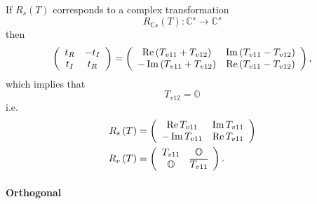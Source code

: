 \documentclass[aps,preprint]{revtex4}%
\begin{document}
If $R_{s}\left(  T\right)  $ corresponds to a complex transformation
\begin{equation}
R_{\mathbb{C}s}\left(  T\right)  :\mathbb{C}^{s}\rightarrow\mathbb{C}^{s}%
\end{equation}
then
\begin{equation}
\left(
\begin{array}
[c]{cc}%
t_{R} & -t_{I}\\
t_{I} & t_{R}%
\end{array}
\right)  =\left(
\begin{array}
[c]{cc}%
\operatorname{Re}\left(  T_{v11}+T_{v12}\right)  & \operatorname{Im}\left(
T_{v11}-T_{v12}\right) \\
-\operatorname{Im}\left(  T_{v11}+T_{v12}\right)  & \operatorname{Re}\left(
T_{v11}-T_{v12}\right)
\end{array}
\right)  ,
\end{equation}
which implies that
\begin{equation}
T_{v12}=\mathbb{O}%
\end{equation}
i.e.
\begin{align}
R_{s}\left(  T\right)   &  =\left(
\begin{array}
[c]{cc}%
\operatorname{Re}T_{v11} & \operatorname{Im}T_{v11}\\
-\operatorname{Im}T_{v11} & \operatorname{Re}T_{v11}%
\end{array}
\right) \\
R_{v}\left(  T\right)   &  =\left(
\begin{array}
[c]{cc}%
T_{v11} & \mathbb{O}\\
\mathbb{O} & \overline{T_{v11}}%
\end{array}
\right)  .
\end{align}


\paragraph{Orthogonal}%
\end{document}
